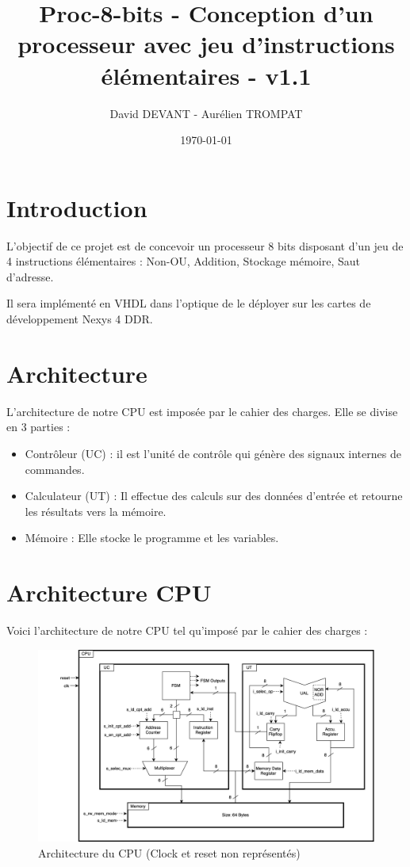 \documentclass{article}
\title{Proc-8-bits - Conception d'un processeur avec jeu d'instructions élémentaires - v1.1}
\author{David DEVANT - Aurélien TROMPAT}
\date{\today}
\begin{document}
    \maketitle

    \tableofcontents
    \newpage

    \section*{Introduction}
    \par L'objectif de ce projet est de concevoir un processeur 8 bits disposant d'un jeu de 4 instructions élémentaires : Non-OU, Addition, Stockage mémoire, Saut d'adresse.
    \par Il sera implémenté en VHDL dans l'optique de le déployer sur les cartes de développement Nexys 4 DDR. 
    \newpage

    \section{Architecture}
    \par L'architecture de notre CPU est imposée par le cahier des charges. Elle se divise en 3 parties :
    \begin{itemize}\renewcommand{\labelitemi}{$\bullet$} 
        \item Contrôleur (UC) : il est l'unité de contrôle qui génère des signaux internes de commandes. 
        \item Calculateur (UT) : Il effectue des calculs sur des données d'entrée et retourne les résultats vers la mémoire.
        \item Mémoire : Elle stocke le programme et les variables.
    \end{itemize}

    \section{Architecture CPU}
    \par Voici l'architecture de notre CPU tel qu'imposé par le cahier des charges :
    \begin{figure}[h]
        \centering
        \includegraphics[width=\textwidth]{../doc/VHDL_Diagram.png}
        \caption{Architecture du CPU (Clock et reset non représentés)}
        \label{fig:vhdl_diagram}
    \end{figure}
\end{document}
